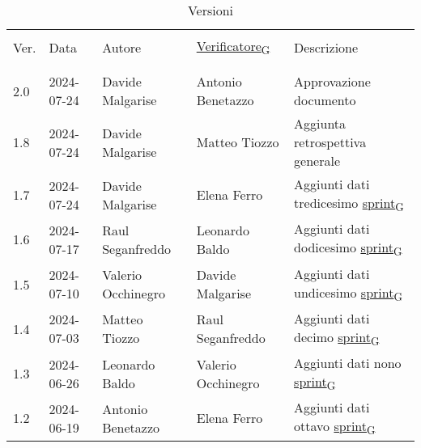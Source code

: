 \documentclass[12pt]{article} %
\begin{document}


\newpage



\begin{table}[!h]
	\footnotesize
	\begin{center}
		\caption*{Versioni}
		\vspace{0.5cm}
		\begin{tabular}{ l l l l p{6cm} }
			\hline                                                                                          \\[-2ex]
			Ver. & Data & Autore & \href{https://7last.github.io/docs/pb/documentazione-interna/glossario\#verificatore}{Verificatore\textsubscript{G}} & Descrizione \\
			\\[-2ex] \hline \\[-1.5ex]
			2.0 & 2024-07-24 & Davide Malgarise   & Antonio Benetazzo  & Approvazione documento\\
			1.8 & 2024-07-24 & Davide Malgarise   & Matteo Tiozzo      & Aggiunta retrospettiva generale\\
			1.7 & 2024-07-24 & Davide Malgarise   & Elena Ferro        & Aggiunti dati tredicesimo \href{https://7last.github.io/docs/pb/documentazione-interna/glossario\#sprint}{sprint\textsubscript{G}}\\
			1.6 & 2024-07-17 & Raul Seganfreddo   & Leonardo Baldo     & Aggiunti dati dodicesimo \href{https://7last.github.io/docs/pb/documentazione-interna/glossario\#sprint}{sprint\textsubscript{G}}\\
			1.5 & 2024-07-10 & Valerio Occhinegro & Davide Malgarise   & Aggiunti dati undicesimo \href{https://7last.github.io/docs/pb/documentazione-interna/glossario\#sprint}{sprint\textsubscript{G}}\\
			1.4 & 2024-07-03 & Matteo Tiozzo      & Raul Seganfreddo   & Aggiunti dati decimo \href{https://7last.github.io/docs/pb/documentazione-interna/glossario\#sprint}{sprint\textsubscript{G}}\\
			1.3 & 2024-06-26 & Leonardo Baldo     & Valerio Occhinegro & Aggiunti dati nono \href{https://7last.github.io/docs/pb/documentazione-interna/glossario\#sprint}{sprint\textsubscript{G}}\\
			1.2 & 2024-06-19 & Antonio Benetazzo  & Elena Ferro        & Aggiunti dati ottavo \href{https://7last.github.io/docs/pb/documentazione-interna/glossario\#sprint}{sprint\textsubscript{G}}\\

\end{tabular}
\end{center}
\end{table}
\end{document}
